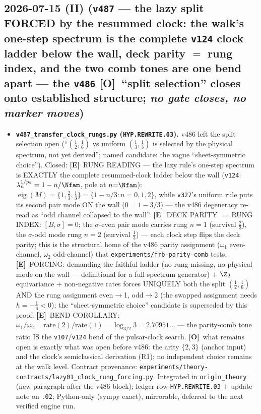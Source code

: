 \documentclass[11pt]{article}
\providecommand{\mE}{\textbf{[E]}}\providecommand{\mC}{\textbf{[C]}}
\providecommand{\mO}{\textbf{[O]}}\providecommand{\mX}{\textbf{[X]}}
\begin{document}
\subsection*{2026-07-15 (II) (\texttt{v487} --- the lazy split FORCED by the resummed clock: the walk's one-step spectrum is the complete \texttt{v124} clock ladder below the wall, deck parity $=$ rung index, and the two comb tones are one bend apart --- the \texttt{v486} \mO\ ``split selection'' closes onto established structure; \emph{no gate closes, no marker moves})}
\begin{itemize}[leftmargin=1.5em]
\item \textbf{\texttt{v487\_transfer\_clock\_rungs.py} (\texttt{HYP.REWRITE.03}).} v486 left the split
selection open (``$(\tfrac12,\tfrac16)$ vs uniform $(\tfrac13,\tfrac13)$ is selected by the physical
spectrum, not yet derived''; named candidate: the vague ``sheet-symmetric choice''). Closed: \mE\ RUNG
READING --- the lazy rule's one-step spectrum is EXACTLY the complete resummed-clock ladder below the
wall (\texttt{v124}: $\lambda_n^{1/p_2}=1-n/\Nfam$, pole at $n{=}\Nfam$):
$\operatorname{eig}(M)=\{1,\tfrac23,\tfrac13\}=\{1-n/3:n=0,1,2\}$, while \texttt{v327}'s uniform rule
puts its second pair mode ON the wall ($0=1-3/3$) --- the v486 degeneracy re-read as ``odd channel
collapsed to the wall''. \mE\ DECK PARITY $=$ RUNG INDEX: $[B,\sigma]=0$; the $\sigma$-even pair mode
carries rung $n{=}1$ (survival $\tfrac23$), the $\sigma$-odd mode rung $n{=}2$ (survival $\tfrac13$) ---
each clock step flips the deck parity; this is the structural home of the v486 parity assignment
($\omega_1$ even-channel, $\omega_2$ odd-channel) that \texttt{experiments/frb-parity-comb} tests.
\mE\ FORCING: demanding the faithful ladder (no rung missing, no physical mode on the wall ---
definitional for a full-spectrum generator) $+$ $\Z_2$ equivariance $+$ non-negative rates forces
UNIQUELY both the split $(\tfrac12,\tfrac16)$ AND the rung assignment even$\to$1, odd$\to$2 (the swapped
assignment needs $h=-\tfrac16<0$); the ``sheet-symmetric choice'' candidate is superseded by this proof.
\mE\ BEND COROLLARY: $\omega_1/\omega_2=\mathrm{rate}(2)/\mathrm{rate}(1)=\log_{3/2}3=2.70951\ldots$ ---
the parity-comb tone ratio IS the \texttt{v107}/\texttt{v124} bend of the pulsar-clock search. \mO\ what
remains open is exactly what was open before v486: the arity $\{2,3\}$ (anchor input) and the clock's
semiclassical derivation (R1); no independent choice remains at the walk level. Contract provenance:
\texttt{experiments/theory-contracts/lazy01\_clock\_rung\_forcing.py}. Integrated in
\texttt{origin\_theory} (new paragraph after the v486 block); ledger row \texttt{HYP.REWRITE.03} $+$
update note on \texttt{.02}; Python-only (sympy exact), mirrorable, deferred to the next verified engine
run.
\end{itemize}
\end{document}
